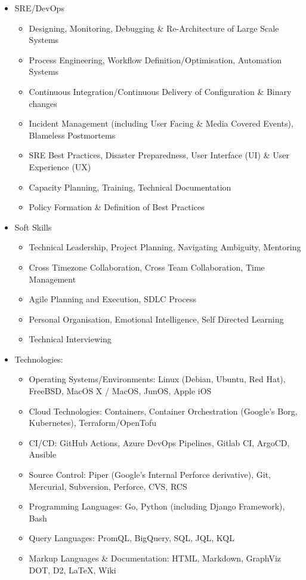 \documentclass[a4paper, 10pt] {article}
\begin{document}
\begin{itemize}[noitemsep]
\item SRE/DevOps
  \begin{itemize}[noitemsep]
  \item Designing, Monitoring, Debugging \& Re-Architecture of Large Scale Systems
  \item Process Engineering, Workflow Definition/Optimisation, Automation Systems
  \item Continuous Integration/Continuous Delivery of Configuration \& Binary changes
  \item Incident Management (including User Facing \& Media Covered Events), Blameless Postmortems
  \item SRE Best Practices, Disaster Preparedness, User Interface (UI) \& User Experience (UX)
  \item Capacity Planning, Training, Technical Documentation
  \item Policy Formation \& Definition of Best Practices
  \end{itemize}
\item Soft Skills
  \begin{itemize}[noitemsep]
  \item Technical Leadership, Project Planning, Navigating Ambiguity, Mentoring
  \item Cross Timezone Collaboration, Cross Team Collaboration, Time Management
  \item Agile Planning and Execution, SDLC Process
  \item Personal Organisation, Emotional Intelligence, Self Directed Learning
  \item Technical Interviewing
  \end{itemize}
\item Technologies:
  \begin{itemize}[noitemsep]
  \item Operating Systems/Environments: Linux (Debian, Ubuntu, Red Hat), FreeBSD, MacOS X / MacOS, JunOS, Apple iOS
  \item Cloud Technologies: Containers, Container Orchestration (Google's Borg, Kubernetes), Terraform/OpenTofu
  \item CI/CD: GitHub Actions, Azure DevOps Pipelines, Gitlab CI, ArgoCD, Ansible
  \item Source Control: Piper (Google's Internal Perforce derivative), Git, Mercurial, Subversion, Perforce, CVS, RCS
  \item Programming Languages: Go, Python (including Django Framework), Bash
  \item Query Languages: PromQL, BigQuery, SQL, JQL, KQL
  \item Markup Languages \& Documentation: HTML, Markdown, GraphViz DOT, D2, \LaTeX, Wiki
  \end{itemize}
\end{itemize}  
\end{document}
